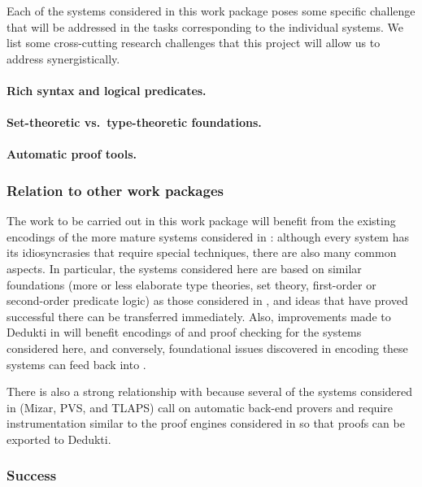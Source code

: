 Each of the systems considered in this work package poses some specific
challenge that will be addressed in the tasks corresponding to the individual
systems. We list some cross-cutting research challenges that this project will
allow us to address synergistically.

\paragraph*{Rich syntax and logical predicates.}



\paragraph*{Set-theoretic vs.\ type-theoretic foundations.}


\paragraph*{Automatic proof tools.}


\subsubsection*{Relation to other work packages}

The work to be carried out in this work package will benefit from the existing
encodings of the more mature systems considered in :
although every system has its idiosyncrasies that require special techniques,
there are also many common aspects. In particular, the systems considered here
are based on similar foundations (more or less elaborate type theories, set
theory, first-order or second-order predicate logic) as those considered in
, and ideas that have proved successful there can be
transferred immediately. Also, improvements made to Dedukti in
 will benefit encodings of and proof checking for the
systems considered here, and conversely, foundational issues discovered in
encoding these systems can feed back into .

There is also a strong relationship with  because several of the
systems considered in  (Mizar, PVS, and TLAPS) call on automatic
back-end provers and require instrumentation similar to the proof engines
considered in  so that proofs can be exported to Dedukti.

\subsubsection*{Success}



